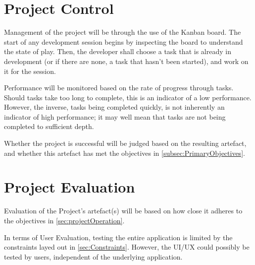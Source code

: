 \documentclass[11pt, a4paper, notitlepage]{report}
\begin{document}
\section{Project Control}
Management of the project will be through the use of the Kanban board. The 
start of any development session begins by inspecting the board to understand 
the state of play. Then, the developer shall choose a task that is already in 
development (or if there are none, a task that hasn't been started), and work 
on it for the session.

Performance will be monitored based on the rate of progress through tasks. 
Should tasks take too long to complete, this is an indicator of a low 
performance. However, the inverse, tasks being completed quickly, is not 
inherently an indicator of high performance; it may well mean that tasks are 
not being completed to sufficient depth.

Whether the project is successful will be judged based on the resulting 
artefact, and whether this artefact has met the objectives in 
\ref{subsec:PrimaryObjectives}.

\section{Project Evaluation}
Evaluation of the Project's artefact(s) will be based on how close it adheres 
to the objectives in \ref{sec:projectOperation}.

In terms of User Evaluation, testing the entire application is limited by the 
constraints layed out in \ref{sec:Constraints}. However, the UI/UX could 
possibly be tested by users, independent of the underlying application.

\appendix
\end{document}
